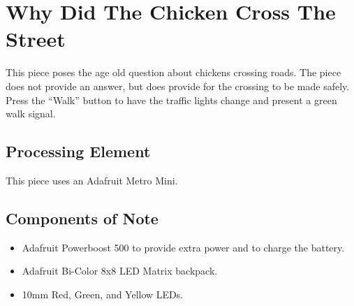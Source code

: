 %
%
%
%
% 
%
%
%
%
%
% 
%

\section{Why Did The Chicken Cross The Street}

This piece poses the age old question about chickens crossing roads.  The 
piece does not provide an answer, but does provide for the crossing to be made 
safely.  Press the ``Walk'' button to have the traffic lights change and 
present a green walk signal.

\subsection*{Processing Element}

This piece uses an Adafruit Metro Mini. 

\subsection*{Components of Note}

\begin{itemize}
\item Adafruit Powerboost 500 to provide extra power and to charge the 
battery.
\item Adafruit Bi-Color 8x8 LED Matrix backpack.
\item 10mm Red, Green, and Yellow LEDs.
\end{itemize}

